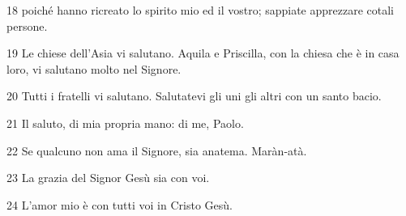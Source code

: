 \par 18 poiché hanno ricreato lo spirito mio ed il vostro; sappiate apprezzare cotali persone.
\par 19 Le chiese dell'Asia vi salutano. Aquila e Priscilla, con la chiesa che è in casa loro, vi salutano molto nel Signore.
\par 20 Tutti i fratelli vi salutano. Salutatevi gli uni gli altri con un santo bacio.
\par 21 Il saluto, di mia propria mano: di me, Paolo.
\par 22 Se qualcuno non ama il Signore, sia anatema. Maràn-atà.
\par 23 La grazia del Signor Gesù sia con voi.
\par 24 L'amor mio è con tutti voi in Cristo Gesù.


